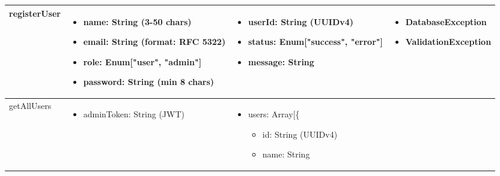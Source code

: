 \documentclass[12pt, titlepage]{article}
\begin{document}
\begin{center}
\begin{tabular}{p{2cm} p{4cm} p{2cm} p{4cm}}
  \hline
  registerUser & 
  \begin{minipage}{3.5cm}
  \vspace{-0.2cm}
  \begin{itemize}[leftmargin=*,noitemsep]
    \item name: String (3-50 chars)
    \item email: String (format: RFC 5322)
    \item role: Enum["user", "admin"]
    \item password: String (min 8 chars)
  \end{itemize}
  \end{minipage} & 
  \begin{minipage}{3.5cm}
  \vspace{-0.2cm}
  \begin{itemize}[leftmargin=*,noitemsep]
    \item userId: String (UUIDv4)
    \item status: Enum["success", "error"]
    \item message: String
  \end{itemize}
  \end{minipage} & 
  \begin{minipage}{3.5cm}
  \vspace{-0.2cm}
  \begin{itemize}[leftmargin=*,noitemsep]
    \item DatabaseException
    \item ValidationException
  \end{itemize}
  \end{minipage} \\
  \hline
  getAllUsers & 
  \begin{minipage}{3.5cm}
  \vspace{-0.2cm}
  \begin{itemize}[leftmargin=*,noitemsep]
    \item adminToken: String (JWT)
  \end{itemize}
  \end{minipage} & 
  \begin{minipage}{3.5cm}
  \vspace{-0.2cm}
  \begin{itemize}[leftmargin=*,noitemsep]
    \item users: Array[\{
      \begin{itemize}[leftmargin=*,noitemsep]
        \item id: String (UUIDv4)
        \item name: String

\end{itemize}
\end{itemize}
\end{minipage}
\end{tabular}
\end{center}
\end{document}
